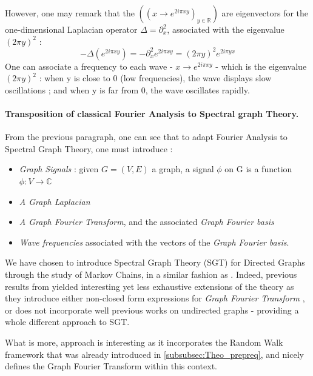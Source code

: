 \documentclass{article}
\begin{document}
However, one may remark that the $((x \rightarrow e^{2i\pi x y })_{y\in \mathbb{R}})$ are eigenvectors for the one-dimensional Laplacian operator $\Delta = \partial^2_{x}$, associated with the eigenvalue $(2\pi y)^2$ : 
\begin{equation}
    - \Delta (e^{2i\pi x y}) = - \partial^2_x e^{2i\pi x y} = (2\pi y)^2  e^{2i\pi y x }
\end{equation}
One can associate a frequency to each wave - $x \rightarrow e^{2i\pi x y }$ - which is the eigenvalue $(2\pi y)^2$ : when y is close to 0 (low frequencies), the wave displays slow oscillations ; and when y is far from 0, the wave oscillates rapidly.


\paragraph{Transposition of classical Fourier Analysis to Spectral graph Theory.} 
From the previous paragraph, one can see that to adapt Fourier Analysis to Spectral Graph Theory, one must introduce : 
\begin{itemize}
    \item \textit{Graph Signals} : given $G=(V,E)$ a graph, a signal $\phi$ on G is a function $\phi : V \rightarrow \mathbb{C}$
    
    \item \textit{A Graph Laplacian}
    
    \item \textit{A Graph Fourier Transform}, and the associated \textit{Graph Fourier basis}
    
    \item \textit{Wave frequencies} associated with the vectors of the \textit{Graph Fourier basis}.
\end{itemize}

We have chosen to introduce Spectral Graph Theory (SGT) for Directed Graphs through the study of Markov Chains, in a similar fashion as \cite{sevi2019}. Indeed, previous results from \cite{sandryhaila_moura_2014,  sardellitti_barbarossa_lorenzo_2017} yielded interesting yet less exhaustive extensions of the theory as they introduce either non-closed form expressions for \textit{Graph Fourier Transform} \cite{sardellitti_barbarossa_lorenzo_2017}, or does not incorporate well previous works on undirected graphs -\cite{sandryhaila_moura_2014} providing a whole different approach to SGT.

What is more, \cite{sevi2019} approach is interesting as it incorporates the Random Walk framework that was already introduced in \ref{subsubsec:Theo_prepreq}, and nicely defines the Graph Fourier Transform within this context.
\end{document}
